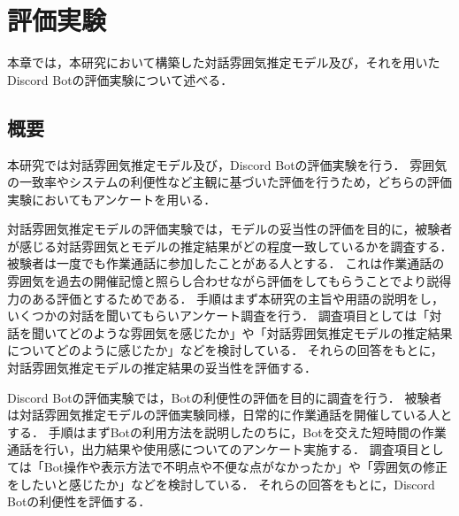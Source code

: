 \chapter{評価実験\label{sec:evaluation_experiment}}
\thispagestyle{plain}

本章では，本研究において構築した対話雰囲気推定モデル及び，それを用いたDiscord Botの評価実験について述べる．

\section{概要}

本研究では対話雰囲気推定モデル及び，Discord Botの評価実験を行う．
雰囲気の一致率やシステムの利便性など主観に基づいた評価を行うため，どちらの評価実験においてもアンケートを用いる．

対話雰囲気推定モデルの評価実験では，モデルの妥当性の評価を目的に，被験者が感じる対話雰囲気とモデルの推定結果がどの程度一致しているかを調査する．
被験者は一度でも作業通話に参加したことがある人とする．
これは作業通話の雰囲気を過去の開催記憶と照らし合わせながら評価をしてもらうことでより説得力のある評価とするためである．
手順はまず本研究の主旨や用語の説明をし，いくつかの対話を聞いてもらいアンケート調査を行う．
調査項目としては「対話を聞いてどのような雰囲気を感じたか」や「対話雰囲気推定モデルの推定結果についてどのように感じたか」などを検討している．
それらの回答をもとに，対話雰囲気推定モデルの推定結果の妥当性を評価する．

Discord Botの評価実験では，Botの利便性の評価を目的に調査を行う．
被験者は対話雰囲気推定モデルの評価実験同様，日常的に作業通話を開催している人とする．
手順はまずBotの利用方法を説明したのちに，Botを交えた短時間の作業通話を行い，出力結果や使用感についてのアンケート実施する．
調査項目としては「Bot操作や表示方法で不明点や不便な点がなかったか」や「雰囲気の修正をしたいと感じたか」などを検討している．
それらの回答をもとに，Discord Botの利便性を評価する．
